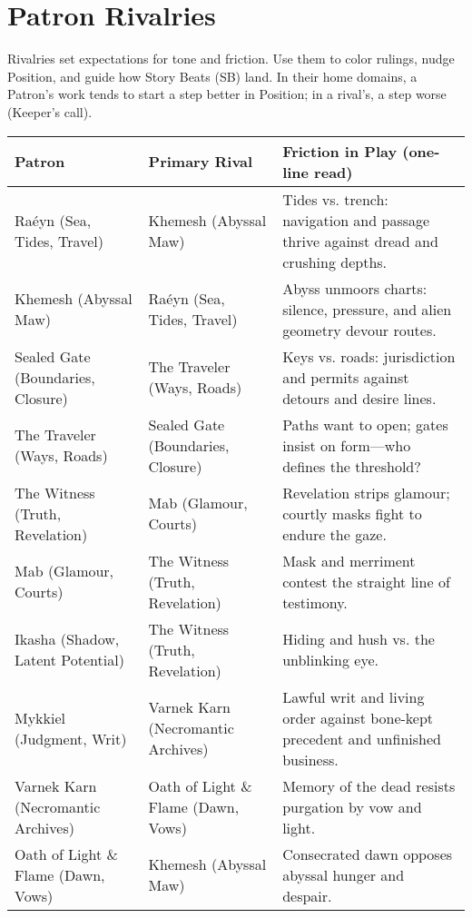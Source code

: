 \section{Patron Rivalries}
\label{sec:patron-rivalries}

Rivalries set expectations for tone and friction. Use them to color rulings, nudge Position, and guide how Story Beats (SB) land. In their home domains, a Patron’s work tends to start a step better in Position; in a rival’s, a step worse (Keeper’s call).

\begin{table}[h!]
  \centering
  \renewcommand{\arraystretch}{1.15}
  \begin{tabular}{@{}p{3.4cm}p{3.4cm}p{8.2cm}@{}}
    \toprule
    \textbf{Patron} & \textbf{Primary Rival} & \textbf{Friction in Play (one-line read)} \\
    \midrule
    Raéyn (Sea, Tides, Travel) & Khemesh (Abyssal Maw) & Tides vs. trench: navigation and passage thrive against dread and crushing depths. \\
    Khemesh (Abyssal Maw) & Raéyn (Sea, Tides, Travel) & Abyss unmoors charts: silence, pressure, and alien geometry devour routes. \\
    Sealed Gate (Boundaries, Closure) & The Traveler (Ways, Roads) & Keys vs. roads: jurisdiction and permits against detours and desire lines. \\
    The Traveler (Ways, Roads) & Sealed Gate (Boundaries, Closure) & Paths want to open; gates insist on form—who defines the threshold? \\
    The Witness (Truth, Revelation) & Mab (Glamour, Courts) & Revelation strips glamour; courtly masks fight to endure the gaze. \\
    Mab (Glamour, Courts) & The Witness (Truth, Revelation) & Mask and merriment contest the straight line of testimony. \\
    Ikasha (Shadow, Latent Potential) & The Witness (Truth, Revelation) & Hiding and hush vs. the unblinking eye. \\
    Mykkiel (Judgment, Writ) & Varnek Karn (Necromantic Archives) & Lawful writ and living order against bone-kept precedent and unfinished business. \\
    Varnek Karn (Necromantic Archives) & Oath of Light \& Flame (Dawn, Vows) & Memory of the dead resists purgation by vow and light. \\
    Oath of Light \& Flame (Dawn, Vows) & Khemesh (Abyssal Maw) & Consecrated dawn opposes abyssal hunger and despair. \\

\end{tabular}
\end{table}
